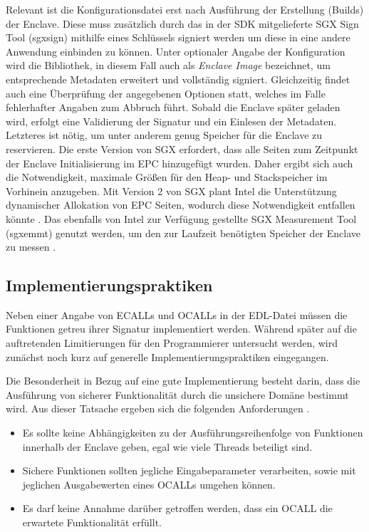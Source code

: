 Relevant ist die Konfigurationsdatei erst nach Ausführung der Erstellung (Builds) der Enclave. Diese muss zusätzlich durch das in der SDK mitgelieferte SGX Sign Tool (sgx\textunderscore sign) mithilfe eines Schlüssels signiert werden um diese in eine andere Anwendung einbinden zu können. Unter optionaler Angabe der Konfiguration wird die Bibliothek, in diesem Fall auch als \textit{Enclave Image} bezeichnet, um entsprechende Metadaten erweitert und vollständig signiert. Gleichzeitig findet auch eine Überprüfung der angegebenen Optionen statt, welches im Falle fehlerhafter Angaben zum Abbruch führt. Sobald die Enclave später geladen wird, erfolgt eine Validierung der Signatur und ein Einlesen der Metadaten. Letzteres ist nötig, um unter anderem genug Speicher für die Enclave zu reservieren. Die erste Version von SGX erfordert, dass alle Seiten zum Zeitpunkt der Enclave Initialisierung im EPC hinzugefügt wurden. Daher ergibt sich auch die Notwendigkeit, maximale Größen für den Heap- und Stackspeicher im Vorhinein anzugeben. Mit Version 2 von SGX plant Intel die Unterstützung dynamischer Allokation von EPC Seiten, wodurch diese Notwendigkeit entfallen könnte \cite{McKeen2016}. Das ebenfalls von Intel zur Verfügung gestellte SGX Measurement Tool (sgx\textunderscore emmt) genutzt werden, um den zur Laufzeit benötigten Speicher der Enclave zu messen \cite{WinDev}.

%

\subsection{Implementierungspraktiken}

Neben einer Angabe von ECALLs und OCALLs in der EDL-Datei müssen die Funktionen getreu ihrer Signatur implementiert werden. Während später auf die auftretenden Limitierungen für den Programmierer untersucht werden, wird zunächst noch kurz auf generelle Implementierungspraktiken eingegangen. 

Die Besonderheit in Bezug auf eine gute Implementierung besteht darin, dass die Ausführung von sicherer Funktionalität durch die unsichere Domäne bestimmt wird. Aus dieser Tatsache ergeben sich die folgenden Anforderungen \cite{WinGuide}.

\begin{itemize}
	\item Es sollte keine Abhängigkeiten zu der Ausführungsreihenfolge von Funktionen innerhalb der Enclave geben, egal wie viele Threads beteiligt sind.
	\item Sichere Funktionen sollten jegliche Eingabeparameter verarbeiten, sowie mit jeglichen Ausgabewerten eines OCALLs umgehen können.
	\item Es darf keine Annahme darüber getroffen werden, dass ein OCALL die erwartete Funktionalität erfüllt.
\end{itemize}

